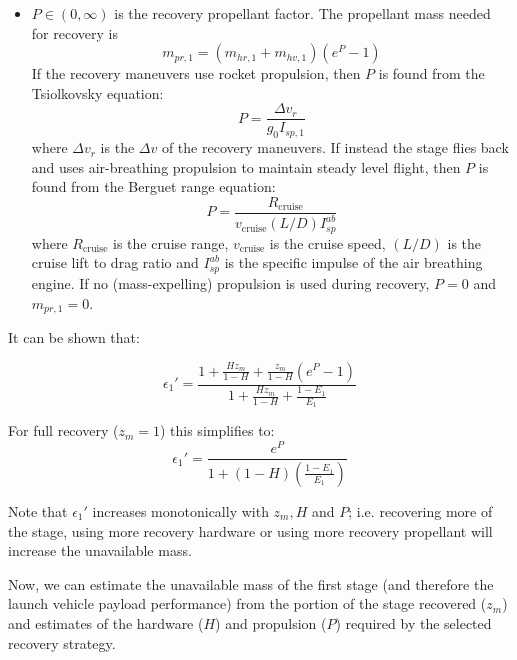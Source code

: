 \documentclass{iaf-iac}
\begin{document}
\begin{multicols}{2}
\begin{itemize}
    \item $P \in (0, \infty)$  is the recovery propellant factor. The propellant mass needed for recovery is
    \begin{equation}
    m_{pr,1} = (m_{hr,1} + m_{hv,1}) \left( e^P - 1 \right)
    \end{equation}
    If the recovery maneuvers use rocket propulsion, then $P$ is found from the Tsiolkovsky equation:
    \begin{equation}
    \label{eq:rocket_p}
    P = \frac{\Delta v_r}{g_0 I_{sp,1}}
    \end{equation}
    where $\Delta v_r$ is the $\Delta v$ of the recovery maneuvers. If instead the stage flies back and uses air-breathing propulsion to maintain steady level flight, then $P$ is found from the Berguet range equation:
    \begin{equation}
    \label{eq:berguet_p}
    P =  \frac{R_{\mathrm{cruise}}}{v_{\mathrm{cruise}} (L/D) I_{sp}^{ab}}
    \end{equation}
    where $R_{\mathrm{cruise}}$ is the cruise range, $v_{\mathrm{cruise}}$ is the cruise speed, $(L/D)$ is the cruise lift to drag ratio and $I_{sp}^{ab}$ is the specific impulse of the air breathing engine. If no (mass-expelling) propulsion is used during recovery, $P = 0$ and $m_{pr,1} = 0$.
\end{itemize}

It can be shown that:

\begin{equation}
\label{eq:eps_h_p_z}
\epsilon_1' = \frac{1 + \frac{H z_m}{1 - H} +  \frac{z_m}{1 - H} (e^P - 1) }{1 + \frac{H z_m}{1 - H} + \frac{1 - E_1}{E_1} }
\end{equation}

For full recovery ($z_m = 1$) this simplifies to:
\begin{equation}
\epsilon_1' = \frac{e^P}{1 + (1 - H) \left( \frac{1 - E_1}{E_1} \right)}
\end{equation}

Note that $\epsilon_1'$ increases monotonically with $z_m, H$ and $P$; i.e. recovering more of the stage, using more recovery hardware or using more recovery propellant will increase the unavailable mass.

Now, we can estimate the unavailable mass of the first stage (and therefore the launch vehicle payload performance) from the portion of the stage recovered ($z_m$) and estimates of the hardware ($H$) and propulsion ($P$) required by the selected recovery strategy. 


\end{multicols}
\end{document}
